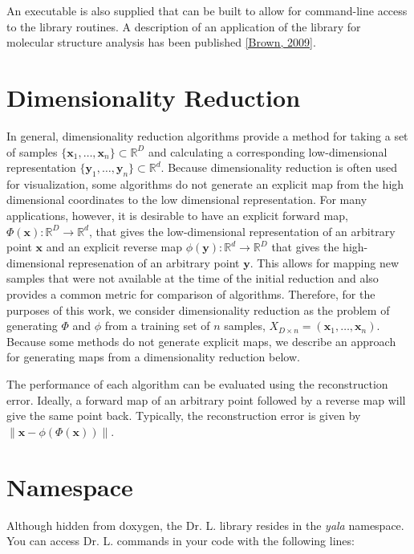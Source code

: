 An executable is also supplied that can be built to allow for command-line access to the library routines. A description of an application of the library for molecular structure analysis has been published \hyperlink{index_ref}{\mbox{[}Brown, 2009\mbox{]}}.

\par
 \par
 \hypertarget{index_dimred}{}\section{Dimensionality Reduction}\label{index_dimred}
In general, dimensionality reduction algorithms provide a method for taking a set of samples $\{\mathbf{x}_1, \dots, \mathbf{x}_n \} \subset \mathbb{R}^D$ and calculating a corresponding low-dimensional representation $\{\mathbf{y}_1, \dots, \mathbf{y}_n \} \subset \mathbb{R}^d$. Because dimensionality reduction is often used for visualization, some algorithms do not generate an explicit map from the high dimensional coordinates to the low dimensional representation. For many applications, however, it is desirable to have an explicit forward map, $\Phi(\mathbf{x}) : \mathbb{R}^D \rightarrow \mathbb{R}^d$, that gives the low-dimensional representation of an arbitrary point $\mathbf{x}$ and an explicit reverse map $\phi(\mathbf{y}) : \mathbb{R}^d \rightarrow \mathbb{R}^D$ that gives the high-dimensional represenation of an arbitrary point $\mathbf{y}$. This allows for mapping new samples that were not available at the time of the initial reduction and also provides a common metric for comparison of algorithms. Therefore, for the purposes of this work, we consider dimensionality reduction as the problem of generating $\Phi$ and $\phi$ from a training set of $n$ samples, $X_{D \times n} = (\mathbf{x}_1, \dots, \mathbf{x}_n )$. Because some methods do not generate explicit maps, we describe an approach for generating maps from a dimensionality reduction below.

The performance of each algorithm can be evaluated using the reconstruction error. Ideally, a forward map of an arbitrary point followed by a reverse map will give the same point back. Typically, the reconstruction error is given by $\|\mathbf{x}-\phi(\Phi(\mathbf{x}))\|$.

\par
 \par
 \hypertarget{index_ns}{}\section{Namespace}\label{index_ns}
Although hidden from doxygen, the Dr. L. library resides in the {\em yala\/} namespace. You can access Dr. L. commands in your code with the following lines:



